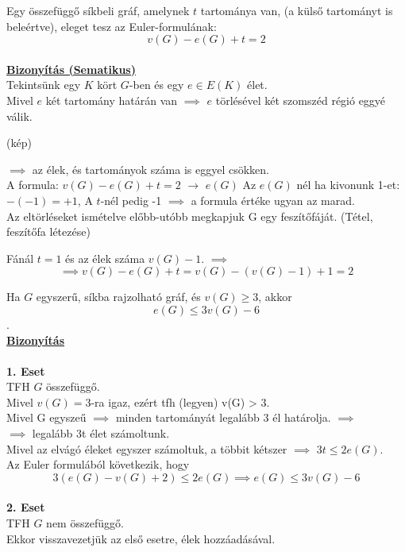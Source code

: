 \documentclass{beamer}
\newcommand{\msmallskip}{\vspace{0.3em}}
\newcommand{\mmedskip}{\vspace{0.5em}}
\begin{document}
\begin{frame}
\begin{tcolorbox}[title={Tétel: Euler formula}]
Egy összefüggő síkbeli gráf, amelynek $t$ tartománya van, (a külső tartományt is beleértve), eleget tesz az Euler-formulának:
$$v(G) - e(G) + t = 2$$\\
\tcblower
\msmallskip
\underline{\textbf{Bizonyítás (Sematikus)}}\\
\mmedskip
Tekintsünk egy $K$ kört $G$-ben és egy $e \in E(K)$ élet.\\
Mivel $e$ két tartomány határán van $\implies$ $e$ törlésével két szomszéd régió eggyé válik.

(kép)

$\implies$ az élek, és tartományok száma is eggyel csökken.\\
A formula: $v(G) - e(G) + t = 2$ $\rightarrow$ $e(G)$ Az $e(G)$ nél ha kivonunk 1-et: $-(-1) = +1$, A $t$-nél pedig -1 $\implies$ a formula értéke ugyan az marad.\\

Az eltörléseket ismételve előbb-utóbb megkapjuk G egy feszítőfáját. (Tétel, feszítőfa létezése)

Fánál $t = 1$ és az élek száma $v(G) - 1$. $\implies$
$$\implies v(G) - e(G) + t = v(G) - (v(G) - 1) + 1 = 2$$

\end{tcolorbox}
\end{frame}

\begin{frame}
\begin{tcolorbox}[title={Tétel: Síkgráf élszáma}]
Ha $G$ egyszerű, síkba rajzolható gráf, és $v(G) \geq 3$, akkor $$e(G) \leq 3v(G) - 6$$.\\
\tcblower
\msmallskip
\underline{\textbf{Bizonyítás}}\\
\mmedskip
\\
\textbf{1. Eset}\\
TFH $G$ összefüggő.\\
Mivel $v(G) = 3$-ra igaz, ezért tfh (legyen) v(G) > 3.\\
Mivel G egyszeű $\implies$ minden tartományát legalább 3 él határolja. $\implies$\\
$\implies$ legalább 3t élet számoltunk.\\
Mivel az elvágó éleket egyszer számoltuk, a többit kétszer $\implies$ $3t \leq 2e(G)$.\\
Az Euler formulából következik, hogy $$3(e(G) - v(G) + 2) \leq 2e(G) \implies e(G) \leq 3v(G) - 6$$\\
\msmallskip
\textbf{2. Eset}\\
TFH $G$ nem összefüggő.\\
Ekkor visszavezetjük az első esetre, élek hozzáadásával.
\end{tcolorbox}
\end{frame}
\end{document}
